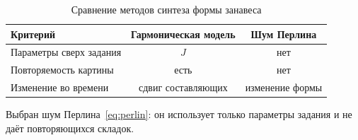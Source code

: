 \begin{table}[H]
	\caption{Сравнение методов синтеза формы занавеса}
	\label{tab:synthesis}
	\begin{tabular}{|L{0.44}|C{0.27}|C{0.27}|}
		\hline
		Критерий & Гармоническая модель & Шум Перлина \\
		\hline
		Параметры сверх задания & $J$ & нет \\
		\hline
		Повторяемость картины & есть & нет \\
		\hline
		Изменение во времени & сдвиг составляющих & изменение формы \\
		\hline
	\end{tabular}
\end{table}

Выбран шум Перлина~\eqref{eq:perlin}: он использует только параметры задания и не даёт повторяющихся складок.